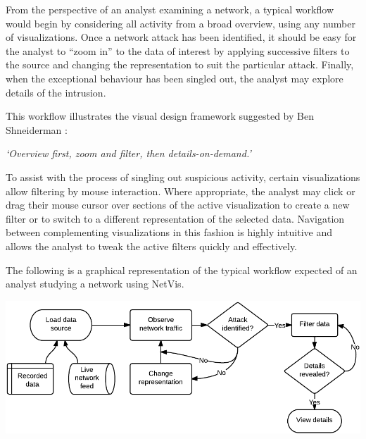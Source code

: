 From the perspective of an analyst examining a network, a typical workflow
would begin by considering all activity from a broad overview, using any
number of visualizations. Once a network attack has been identified, it should
be easy for the analyst to ``zoom in'' to the data of interest by applying
successive filters to the source and changing the representation to suit the
particular attack. Finally, when the exceptional behaviour has been singled
out, the analyst may explore details of the intrusion.

This workflow illustrates the visual design framework suggested by Ben
Shneiderman \cite{shneiderman1996designing}:

\begin{center}
    \textit{`Overview first, zoom and filter, then details-on-demand.'}
\end{center}

To assist with the process of singling out suspicious activity, certain
visualizations allow filtering by mouse interaction. Where appropriate, the
analyst may click or drag their mouse cursor over sections of the active
visualization to create a new filter or to switch to a different representation
of the selected data. Navigation between complementing visualizations in this
fashion is highly intuitive and allows the analyst to tweak the active filters
quickly and effectively.

The following is a graphical representation of the typical workflow expected of
an analyst studying a network using NetVis.

\includegraphics[width=\linewidth]{materials/workflow-diagram.png}
